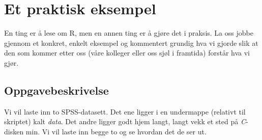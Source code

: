 \documentclass[
  letterpaper,
  DIV=11,
  numbers=noendperiod]{scrartcl}
\author{}
\date{}
\begin{document}
\ifdefined\Shaded\renewenvironment{Shaded}{\begin{tcolorbox}[interior hidden, breakable, frame hidden, boxrule=0pt, sharp corners, enhanced, borderline west={3pt}{0pt}{shadecolor}]}{\end{tcolorbox}}\fi

\hypertarget{et-praktisk-eksempel}{%
\section{Et praktisk eksempel}\label{et-praktisk-eksempel}}

En ting er å lese om R, men en annen ting er å gjøre det i praksis. La
oss jobbe gjennom et konkret, enkelt eksempel og kommentert grundig hva
vi gjorde slik at den som kommer etter oss (våre kolleger eller oss sjøl
i framtida) forstår hva vi gjør.

\hypertarget{oppgavebeskrivelse}{%
\subsection{Oppgavebeskrivelse}\label{oppgavebeskrivelse}}

Vi vil laste inn to SPSS-datasett. Det ene ligger i en undermappe
(relativt til skriptet) kalt \emph{data}. Det andre ligger godt hjem
langt, langt vekk et sted på \emph{C}-disken min. Vi vil laste inn begge
to og se hvordan det de ser ut.
\end{document}
